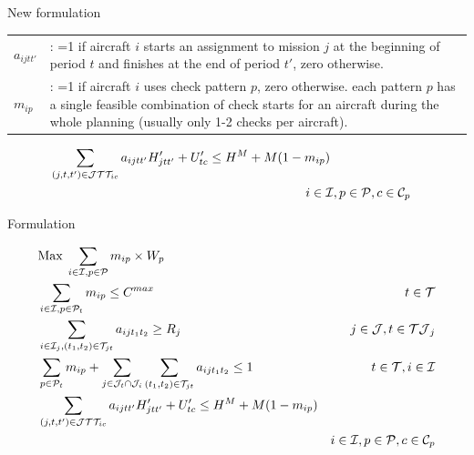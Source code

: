 \section{\secondtitle}

\begin{frame}

\begin{block}{New formulation}

\begin{tabular}{p{15mm}p{110mm}}
  $a_{ijtt'}$ & : =1 if aircraft $i$ starts an assignment to mission $j$ at the beginning of period $t$ and finishes at the end of period $t'$, zero otherwise.  \\
  $m_{ip}$ &: =1 if aircraft $i$ uses check pattern $p$, zero otherwise.
 each pattern $p$ has a single feasible combination of check starts for an aircraft during the whole planning (usually only 1-2 checks per aircraft). \\
\end{tabular}

\begin{align}
  & \sum_{(j, t, t') \in \mathcal{J}\mathcal{T}\mathcal{T}_{ic}} a_{ijtt'} H^\prime_{jtt'} + U^{\prime}_{tc} \leq H^{M} + M (1 - m_{ip}) & \notag \\
  & \hspace{200px}  i \in \mathcal{I}, p \in \mathcal{P}, c \in \mathcal{C}_p \label{eq:cycle_hours2}\\
\end{align}

\end{block}

\end{frame}

\begin{frame}

\begin{block}{Formulation}

\begin{align}
  & \text{Max}\;
  \sum_{i \in \mathcal{I}, p \in \mathcal{P}} m_{ip} \times W_p \\
  & \sum_{i \in \mathcal{I}, p \in \mathcal{P}_{t}} m_{ip} \leq C^{max} 
          & t \in \mathcal{T} \label{eq:capacity1}\\
  & \sum_{i \in \mathcal{I}_j, (t_1, t_2) \in \mathcal{T}_{jt}} a_{ijt_1t_2} \geq R_j
          & j \in \mathcal{J}, t \in \mathcal{TJ}_j  \label{eq:missionres}\\
  & \sum_{p \in \mathcal{P}_{t}} m_{ip} + \sum_{j \in \mathcal{J}_t \cap \mathcal{J}_i} \sum_{(t_1, t_2) \in \mathcal{T}_{jt}} a_{ijt_1t_2} \leq 1 
          & t \in \mathcal{T}, i \in \mathcal{I} \label{eq:state}\\
  & \sum_{(j, t, t') \in \mathcal{J}\mathcal{T}\mathcal{T}_{ic}} a_{ijtt'} H^\prime_{jtt'} + U^{\prime}_{tc} \leq H^M + M (1 - m_{ip}) & \notag \\
    & & i \in \mathcal{I}, p \in \mathcal{P}, c \in \mathcal{C}_p \\
\end{align}

\end{block}

\end{frame}

